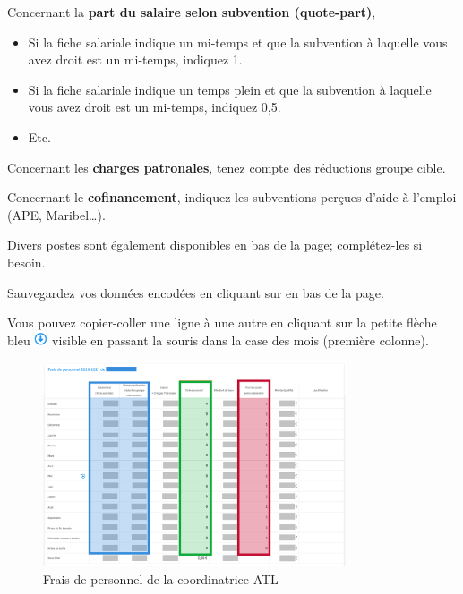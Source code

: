 Concernant la \textbf{part du salaire selon subvention (quote-part)},
\begin{itemize}
    \item Si la fiche salariale indique un mi-temps et que la subvention à laquelle vous avez droit est un mi-temps, indiquez 1.
    \item Si la fiche salariale indique un temps plein et que la subvention à laquelle vous avez droit est un mi-temps, indiquez 0,5.
    \item Etc.
\end{itemize}



Concernant les \textbf{charges patronales}, tenez compte des réductions groupe cible. 

Concernant le \textbf{cofinancement}, indiquez les subventions perçues d’aide à l’emploi (APE, Maribel…).

Divers postes sont également disponibles en bas de la page; complétez-les si besoin. 


Sauvegardez vos données encodées en cliquant sur  en bas de la page. 


\begin{info}
Vous pouvez copier-coller une ligne à une autre en cliquant sur la petite flèche bleu \includegraphics[height=0.4cm]{Images/icon/icon_copy_paste.png} visible en passant la souris dans la case des mois (première colonne).
\end{info}


\begin{figure}[htbp]
    \centering
    \includegraphics[width=9cm]{Images/catl/frais_personnel.png}
    \caption{Frais de personnel de la coordinatrice ATL}
    \label{fig:catl_frais_personnnel}
\end{figure}



